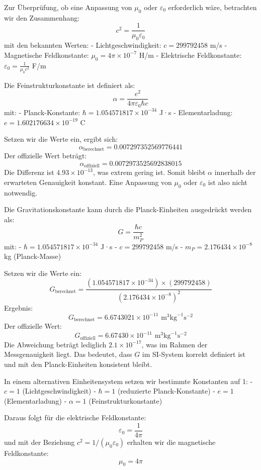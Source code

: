 \documentclass{article}
\begin{document}
	
	Zur Überprüfung, ob eine Anpassung von \( \mu_0 \) oder \( \varepsilon_0 \) erforderlich wäre, betrachten wir den Zusammenhang:
	\[
	c^2 = \frac{1}{\mu_0 \varepsilon_0}
	\]
	mit den bekannten Werten:
	- Lichtgeschwindigkeit: \( c = 299792458 \) m/s
	- Magnetische Feldkonstante: \( \mu_0 = 4\pi \times 10^{-7} \) H/m
	- Elektrische Feldkonstante: \( \varepsilon_0 = \frac{1}{\mu_0 c^2} \) F/m
	
	Die Feinstrukturkonstante ist definiert als:
	\[
	\alpha = \frac{e^2}{4\pi \varepsilon_0 \hbar c}
	\]
	mit:
	- Planck-Konstante: \( \hbar = 1.054571817 \times 10^{-34} \) J·s
	- Elementarladung: \( e = 1.602176634 \times 10^{-19} \) C
	
	Setzen wir die Werte ein, ergibt sich:
	\[
	\alpha_{\text{berechnet}} = 0.007297352569776441
	\]
	Der offizielle Wert beträgt:
	\[
	\alpha_{\text{offiziell}} = 0.0072973525692838015
	\]
	Die Differenz ist \( 4.93 \times 10^{-13} \), was extrem gering ist. Somit bleibt \( \alpha \) innerhalb der erwarteten Genauigkeit konstant. Eine Anpassung von \( \mu_0 \) oder \( \varepsilon_0 \) ist also nicht notwendig.
	
	Die Gravitationskonstante kann durch die Planck-Einheiten ausgedrückt werden als:
	\[
	G = \frac{\hbar c}{m_P^2}
	\]
	mit:
	- \( \hbar = 1.054571817 \times 10^{-34} \) J·s
	- \( c = 299792458 \) m/s
	- \( m_P = 2.176434 \times 10^{-8} \) kg (Planck-Masse)
	
	Setzen wir die Werte ein:
	\[
	G_{\text{berechnet}} = \frac{(1.054571817 \times 10^{-34}) \times (299792458)}{(2.176434 \times 10^{-8})^2}
	\]
	Ergebnis:
	\[
	G_{\text{berechnet}} = 6.6743021 \times 10^{-11} \text{ m}^3\text{kg}^{-1}\text{s}^{-2}
	\]
	Der offizielle Wert:
	\[
	G_{\text{offiziell}} = 6.67430 \times 10^{-11} \text{ m}^3\text{kg}^{-1}\text{s}^{-2}
	\]
	Die Abweichung beträgt lediglich \( 2.1 \times 10^{-17} \), was im Rahmen der Messgenauigkeit liegt. Das bedeutet, dass \( G \) im SI-System korrekt definiert ist und mit den Planck-Einheiten konsistent bleibt.
	
	In einem alternativen Einheitensystem setzen wir bestimmte Konstanten auf 1:
	- \( c = 1 \) (Lichtgeschwindigkeit)
	- \( \hbar = 1 \) (reduzierte Planck-Konstante)
	- \( e = 1 \) (Elementarladung)
	- \( \alpha = 1 \) (Feinstrukturkonstante)
	
	Daraus folgt für die elektrische Feldkonstante:
	\[
	\varepsilon_0 = \frac{1}{4\pi}
	\]
	und mit der Beziehung \( c^2 = 1/(\mu_0 \varepsilon_0) \) erhalten wir die magnetische Feldkonstante:
	\[
	\mu_0 = 4\pi
	\]
	
\end{document}
